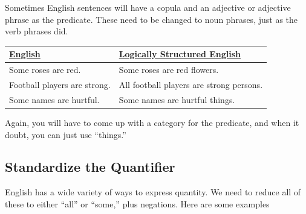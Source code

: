 \noindent Sometimes English sentences will have a copula and an adjective or adjective phrase as the predicate. These need to be changed to noun phrases, just as the verb phrases did.

\begin{longtabu}{p{.5\linewidth}p{.5\linewidth}}
\underline{English} &
\underline{Logically Structured English}  \\
\endhead
Some roses are red. &
Some roses are red flowers. \\

Football players are strong. &
All football players are strong persons. \\

Some names are hurtful. &
Some names are hurtful things.
\end{longtabu}

\noindent Again, you will have to come up with a category for the predicate, and when it doubt, you can just use ``things.''

\subsection{Standardize the Quantifier}
\label{subsec:standardize_quantifier}

English has a wide variety of ways to express quantity. We need to reduce all of these to either ``all'' or ``some,'' plus negations.  Here are some examples

